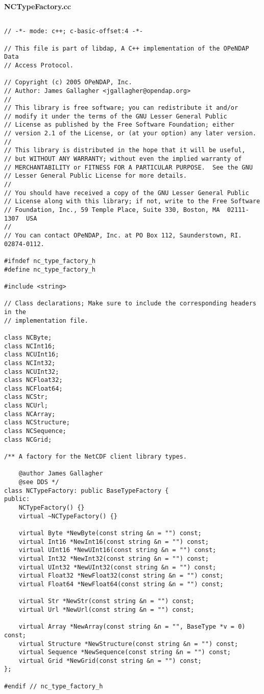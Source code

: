 \documentclass[justify]{dods-paper}
\begin{document}
\W\textbf{NCTypeFactory.cc}
\begin{lstlisting}[caption={NCTypeFactory.h}]

// -*- mode: c++; c-basic-offset:4 -*-

// This file is part of libdap, A C++ implementation of the OPeNDAP Data
// Access Protocol.

// Copyright (c) 2005 OPeNDAP, Inc.
// Author: James Gallagher <jgallagher@opendap.org>
//
// This library is free software; you can redistribute it and/or
// modify it under the terms of the GNU Lesser General Public
// License as published by the Free Software Foundation; either
// version 2.1 of the License, or (at your option) any later version.
// 
// This library is distributed in the hope that it will be useful,
// but WITHOUT ANY WARRANTY; without even the implied warranty of
// MERCHANTABILITY or FITNESS FOR A PARTICULAR PURPOSE.  See the GNU
// Lesser General Public License for more details.
// 
// You should have received a copy of the GNU Lesser General Public
// License along with this library; if not, write to the Free Software
// Foundation, Inc., 59 Temple Place, Suite 330, Boston, MA  02111-1307  USA
//
// You can contact OPeNDAP, Inc. at PO Box 112, Saunderstown, RI. 02874-0112.

#ifndef nc_type_factory_h
#define nc_type_factory_h

#include <string>

// Class declarations; Make sure to include the corresponding headers in the
// implementation file.

class NCByte;
class NCInt16;
class NCUInt16;
class NCInt32;
class NCUInt32;
class NCFloat32;
class NCFloat64;
class NCStr;
class NCUrl;
class NCArray;
class NCStructure;
class NCSequence;
class NCGrid;

/** A factory for the NetCDF client library types.

    @author James Gallagher
    @see DDS */
class NCTypeFactory: public BaseTypeFactory {
public:
    NCTypeFactory() {} 
    virtual ~NCTypeFactory() {}

    virtual Byte *NewByte(const string &n = "") const;
    virtual Int16 *NewInt16(const string &n = "") const;
    virtual UInt16 *NewUInt16(const string &n = "") const;
    virtual Int32 *NewInt32(const string &n = "") const;
    virtual UInt32 *NewUInt32(const string &n = "") const;
    virtual Float32 *NewFloat32(const string &n = "") const;
    virtual Float64 *NewFloat64(const string &n = "") const;

    virtual Str *NewStr(const string &n = "") const;
    virtual Url *NewUrl(const string &n = "") const;

    virtual Array *NewArray(const string &n = "", BaseType *v = 0) const;
    virtual Structure *NewStructure(const string &n = "") const;
    virtual Sequence *NewSequence(const string &n = "") const;
    virtual Grid *NewGrid(const string &n = "") const;
};

#endif // nc_type_factory_h
\end{lstlisting}
\end{document}
